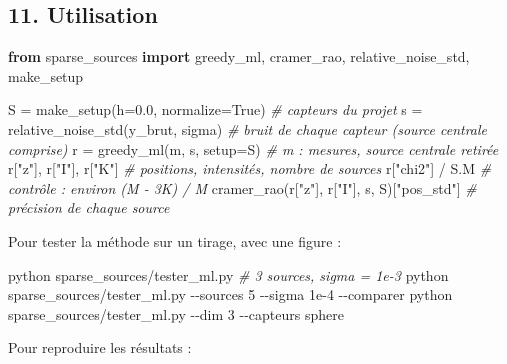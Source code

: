 \documentclass[
  french,
]{article}
\newenvironment{Shaded}{}{}
\newcommand{\AttributeTok}[1]{\textcolor[rgb]{0.49,0.56,0.16}{#1}}
\newcommand{\CommentTok}[1]{\textcolor[rgb]{0.38,0.63,0.69}{\textit{#1}}}
\newcommand{\ExtensionTok}[1]{#1}
\newcommand{\FloatTok}[1]{\textcolor[rgb]{0.25,0.63,0.44}{#1}}
\newcommand{\ImportTok}[1]{\textcolor[rgb]{0.00,0.50,0.00}{\textbf{#1}}}
\newcommand{\NormalTok}[1]{#1}
\newcommand{\OperatorTok}[1]{\textcolor[rgb]{0.40,0.40,0.40}{#1}}
\newcommand{\StringTok}[1]{\textcolor[rgb]{0.25,0.44,0.63}{#1}}
\newcommand{\VariableTok}[1]{\textcolor[rgb]{0.10,0.09,0.49}{#1}}
\begin{document}
\subsection{11. Utilisation}\label{utilisation}

\begin{Shaded}
\begin{Highlighting}[]
\ImportTok{from}\NormalTok{ sparse\_sources }\ImportTok{import}\NormalTok{ greedy\_ml, cramer\_rao, relative\_noise\_std, make\_setup}

\NormalTok{S }\OperatorTok{=}\NormalTok{ make\_setup(h}\OperatorTok{=}\FloatTok{0.0}\NormalTok{, normalize}\OperatorTok{=}\VariableTok{True}\NormalTok{)       }\CommentTok{\# capteurs du projet}
\NormalTok{s }\OperatorTok{=}\NormalTok{ relative\_noise\_std(y\_brut, sigma)       }\CommentTok{\# bruit de chaque capteur (source centrale comprise)}
\NormalTok{r }\OperatorTok{=}\NormalTok{ greedy\_ml(m, s, setup}\OperatorTok{=}\NormalTok{S)                }\CommentTok{\# m : mesures, source centrale retirée}
\NormalTok{r[}\StringTok{"z"}\NormalTok{], r[}\StringTok{"I"}\NormalTok{], r[}\StringTok{"K"}\NormalTok{]                      }\CommentTok{\# positions, intensités, nombre de sources}
\NormalTok{r[}\StringTok{"chi2"}\NormalTok{] }\OperatorTok{/}\NormalTok{ S.M                             }\CommentTok{\# contrôle : environ (M {-} 3K) / M}
\NormalTok{cramer\_rao(r[}\StringTok{"z"}\NormalTok{], r[}\StringTok{"I"}\NormalTok{], s, S)[}\StringTok{"pos\_std"}\NormalTok{] }\CommentTok{\# précision de chaque source}
\end{Highlighting}
\end{Shaded}

Pour tester la méthode sur un tirage, avec une figure :

\begin{Shaded}
\begin{Highlighting}[]
\ExtensionTok{python}\NormalTok{ sparse\_sources/tester\_ml.py                       }\CommentTok{\# 3 sources, sigma = 1e{-}3}
\ExtensionTok{python}\NormalTok{ sparse\_sources/tester\_ml.py }\AttributeTok{{-}{-}sources}\NormalTok{ 5 }\AttributeTok{{-}{-}sigma}\NormalTok{ 1e{-}4 }\AttributeTok{{-}{-}comparer}
\ExtensionTok{python}\NormalTok{ sparse\_sources/tester\_ml.py }\AttributeTok{{-}{-}dim}\NormalTok{ 3 }\AttributeTok{{-}{-}capteurs}\NormalTok{ sphere}
\end{Highlighting}
\end{Shaded}

Pour reproduire les résultats :
\end{document}
